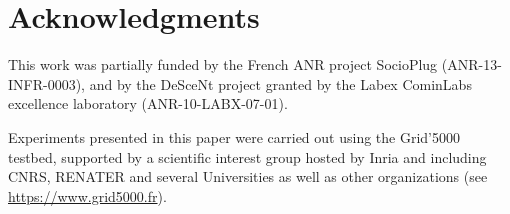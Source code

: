 \section{Acknowledgments}

This work was partially funded by the French ANR project SocioPlug
(ANR-13-INFR-0003), and by the DeSceNt project granted by the Labex
CominLabs excellence laboratory (ANR-10-LABX-07-01).

Experiments presented in this paper were carried out using the Grid'5000
testbed, supported by a scientific interest group hosted by Inria and including
CNRS, RENATER and several Universities as well as other organizations (see
\url{https://www.grid5000.fr}).
